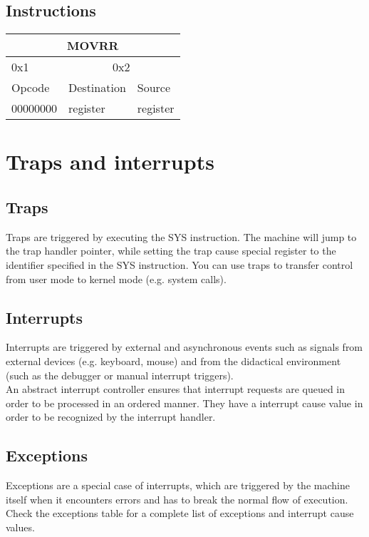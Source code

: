 \documentclass{article}
\begin{document}
\subsection{Instructions}
\begin{table}[h!]
\centering
\begin{tabular} { | p{2cm} | | p{2cm} | p{2cm} |}
  \hline
  \multicolumn{3}{|c|}{MOVRR}\\
  \hline
  0x1 & \multicolumn{2}{|c|}{0x2}\\
  \hline
  Opcode & Destination & Source\\
  00000000 & register & register\\
  \hline
\end{tabular}
\end{table}

\section{Traps and interrupts}
\subsection{Traps}
Traps are triggered by executing the SYS instruction. The machine will jump to the trap handler pointer, while setting the trap cause special register to the identifier specified in the SYS instruction. You can use traps to transfer control from user mode to kernel mode (e.g. system calls).
\subsection{Interrupts}
Interrupts are triggered by external and asynchronous events such as signals from external devices (e.g. keyboard, mouse) and from the didactical environment (such as the debugger or manual interrupt triggers). \\An abstract interrupt controller ensures that interrupt requests are queued in order to be processed in an ordered manner. They have a interrupt cause value in order to be recognized by the interrupt handler.
\subsection{Exceptions}
Exceptions are a special case of interrupts, which are triggered by the machine itself when it encounters errors and has to break the normal flow of execution. Check the exceptions table for a complete list of exceptions and interrupt cause values.

\newpage
\end{document}
